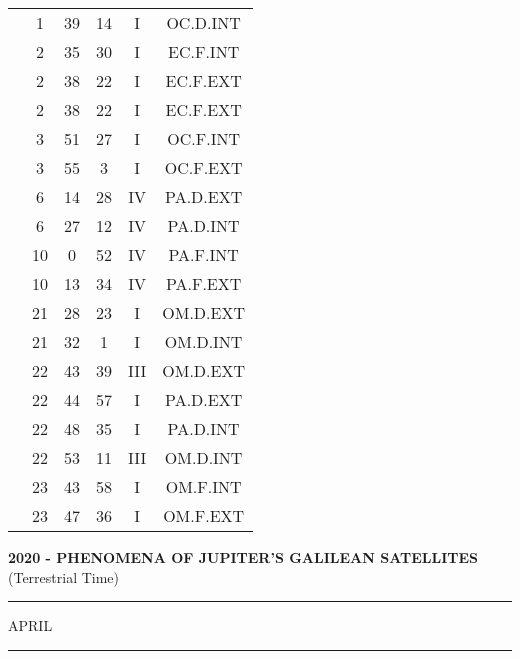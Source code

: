 \documentclass[12pt, a4paper]{article}
\begin{document}
\begin{multicols}{3}
{\begin{tabular}{c c c c c c}
	 	 	 	 & 1 & 39 & 14 & I & OC.D.INT\\%
	 	 	 	 & 2 & 35 & 30 & I & EC.F.INT\\%
	 	 	 	 & 2 & 38 & 22 & I & EC.F.EXT\\%
	 	 	 	 & 2 & 38 & 22 & I & EC.F.EXT\\%
	 	 	 	 & 3 & 51 & 27 & I & OC.F.INT\\%
	 	 	 	 & 3 & 55 & 3 & I & OC.F.EXT\\%
	 	 	 	 & 6 & 14 & 28 & IV & PA.D.EXT\\%
	 	 	 	 & 6 & 27 & 12 & IV & PA.D.INT\\%
	 	 	 	 & 10 & 0 & 52 & IV & PA.F.INT\\%
	 	 	 	 & 10 & 13 & 34 & IV & PA.F.EXT\\%
	 	 	 	 & 21 & 28 & 23 & I & OM.D.EXT\\%
	 	 	 	 & 21 & 32 & 1 & I & OM.D.INT\\%
	 	 	 	 & 22 & 43 & 39 & III & OM.D.EXT\\%
	 	 	 	 & 22 & 44 & 57 & I & PA.D.EXT\\%
	 	 	 	 & 22 & 48 & 35 & I & PA.D.INT\\%
	 	 	 	 & 22 & 53 & 11 & III & OM.D.INT\\%
	 	 	 	 & 23 & 43 & 58 & I & OM.F.INT\\%
	 	 	 	 & 23 & 47 & 36 & I & OM.F.EXT\\%
	 	 \end{tabular}
 	}
\end{multicols}
\textbf{2020 - PHENOMENA OF JUPITER'S GALILEAN SATELLITES}\\(Terrestrial Time) 
\vspace{0.1cm} \hrule \vspace{0.1cm}
APRIL\vspace{0.1cm}
\hrule
\vspace{-0.2cm}
\end{document}
